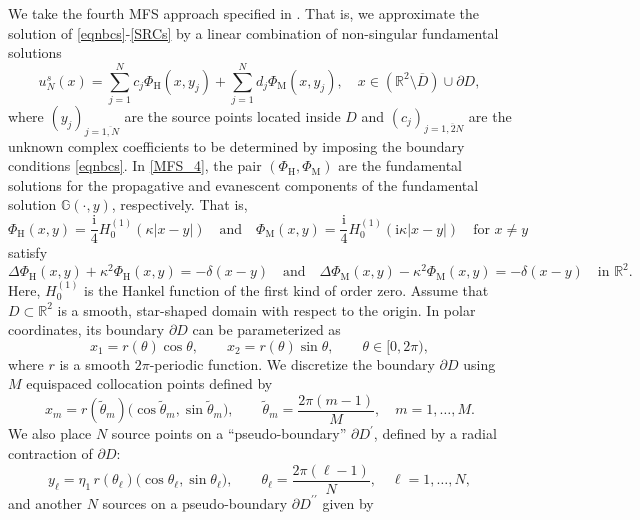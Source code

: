\documentclass{article}
\begin{document}
We take the fourth MFS approach specified in \cite{karageorghislesnic2024}. That is, we approximate the solution of \eqref{eqnbcs}-\eqref{SRCs} by a linear combination of non-singular fundamental solutions
\begin{equation}\label{MFS_4}
    u_{N}^s(x)=\sum_{j=1}^N c_j\Phi_{\mathrm H}(x,y_j)+\sum_{j=1}^Nd_j\Phi_{\mathrm M}(x,y_j),\quad x\in (\mathbb R^2\setminus\overline D)\cup \partial D,
\end{equation}
where $(y_j)_{j=\overline{1,N}}$ are the source points located inside $D$ and $(c_j)_{j=\overline{1,2N}}$ are the unknown complex coefficients to be determined by imposing the boundary conditions \eqref{eqnbcs}. In \eqref{MFS_4}, the pair $(\Phi_{\mathrm H},\Phi_{\mathrm M})$ are the fundamental solutions for the propagative and evanescent components of the fundamental solution $\mathbb G(\cdot,y)$, respectively. That is, 
\[
\Phi_{\mathrm H}(x,y)=\frac{\mathrm i}{4}H_0^{(1)}(\kappa|x-y|)\quad \text{and}\quad \Phi_{\mathrm M}(x,y)=\frac{\mathrm i}{4}H_{0}^{(1)}(\mathrm i\kappa|x-y|)\quad\text{for } x\neq y
\]
satisfy
\[
\Delta \Phi_{\mathrm H}(x,y)+\kappa^2\Phi_{\mathrm H}(x,y)=-\delta(x-y)\quad \text{and}\quad \Delta \Phi_{\mathrm M}(x,y)-\kappa^2\Phi_{\mathrm M}(x,y)=-\delta(x-y)\quad \text{in }\mathbb R^2.
\]
Here, $H_0^{(1)}$ is the Hankel function of the first kind of order zero.
Assume that $D \subset \mathbb{R}^2$ is a smooth, star-shaped domain with respect to the origin. In polar coordinates, its boundary $\partial D$ can be parameterized as
\begin{equation}
\label{eq:param_boundary}
x_1 = r(\theta)\cos\theta, 
\qquad 
x_2 = r(\theta)\sin\theta,
\qquad \theta \in [0,2\pi),
\end{equation}
where $r$ is a smooth $2\pi$-periodic function. We discretize the boundary $\partial D$ using $M$ equispaced collocation points defined by
\begin{equation}
\label{eq:collocation}
x_m = r(\tilde{\theta}_m)\big(\cos\tilde{\theta}_m, \sin\tilde{\theta}_m\big),
\qquad
\tilde{\theta}_m = \frac{2\pi(m-1)}{M},
\quad m=1,\dots,M.
\end{equation}
We also place $N$ source points on a ``pseudo-boundary'' $\partial D^\prime$, defined by a radial contraction of $\partial D$:
\begin{equation}
\label{eq:mfs1}
y_\ell = \eta_1\, r(\theta_\ell)\big(\cos\theta_\ell, \sin\theta_\ell\big),
\qquad
\theta_\ell = \frac{2\pi(\ell-1)}{N}, \quad \ell=1,\dots,N,
\end{equation}
and another $N$ sources on a pseudo-boundary $\partial D^{\prime\prime}$ given by 
\end{document}
